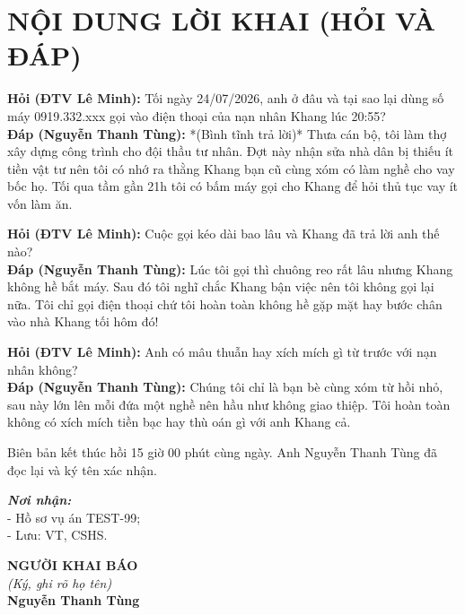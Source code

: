 \documentclass[12pt,a4paper]{article}
\begin{document}
\section*{NỘI DUNG LỜI KHAI (HỎI VÀ ĐÁP)}

\noindent \textbf{Hỏi (ĐTV Lê Minh):} Tối ngày 24/07/2026, anh ở đâu và tại sao lại dùng số máy 0919.332.xxx gọi vào điện thoại của nạn nhân Khang lúc 20:55?\\
\textbf{Đáp (Nguyễn Thanh Tùng):} *(Bình tĩnh trả lời)* Thưa cán bộ, tôi làm thợ xây dựng công trình cho đội thầu tư nhân. Đợt này nhận sửa nhà dân bị thiếu ít tiền vật tư nên tôi có nhớ ra thằng Khang bạn cũ cùng xóm có làm nghề cho vay bốc họ. Tối qua tầm gần 21h tôi có bấm máy gọi cho Khang để hỏi thủ tục vay ít vốn làm ăn.

\noindent \textbf{Hỏi (ĐTV Lê Minh):} Cuộc gọi kéo dài bao lâu và Khang đã trả lời anh thế nào?\\
\textbf{Đáp (Nguyễn Thanh Tùng):} Lúc tôi gọi thì chuông reo rất lâu nhưng Khang không hề bắt máy. Sau đó tôi nghĩ chắc Khang bận việc nên tôi không gọi lại nữa. Tôi chỉ gọi điện thoại chứ tôi hoàn toàn không hề gặp mặt hay bước chân vào nhà Khang tối hôm đó!

\noindent \textbf{Hỏi (ĐTV Lê Minh):} Anh có mâu thuẫn hay xích mích gì từ trước với nạn nhân không?\\
\textbf{Đáp (Nguyễn Thanh Tùng):} Chúng tôi chỉ là bạn bè cùng xóm từ hồi nhỏ, sau này lớn lên mỗi đứa một nghề nên hầu như không giao thiệp. Tôi hoàn toàn không có xích mích tiền bạc hay thù oán gì với anh Khang cả.

\vspace{0.6cm}
\noindent Biên bản kết thúc hồi 15 giờ 00 phút cùng ngày. Anh Nguyễn Thanh Tùng đã đọc lại và ký tên xác nhận.

\vspace{0.8cm}

\noindent
\begin{minipage}[t]{0.45\textwidth}
    \small
    \textbf{\textit{Nơi nhận:}}\\
    - Hồ sơ vụ án TEST-99;\\
    - Lưu: VT, CSHS.
\end{minipage}
\hfill
\begin{minipage}[t]{0.5\textwidth}
    \begin{center}
        \small
        \textbf{NGƯỜI KHAI BÁO}\\
        \textit{(Ký, ghi rõ họ tên)}\\[1.5cm]
        \textbf{Nguyễn Thanh Tùng}
    \end{center}
\end{minipage}
\end{document}
